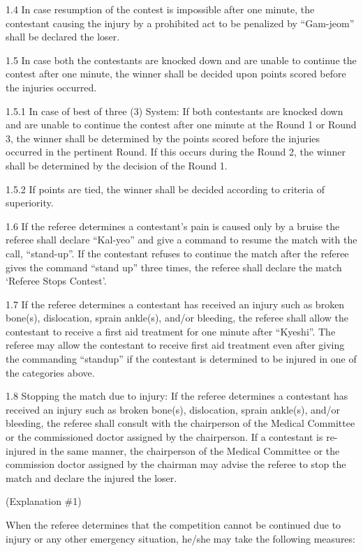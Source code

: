 \documentclass[
]{report}
\begin{document}
1.4 In case resumption of the contest is impossible after one minute,
the contestant causing the injury by a prohibited act to be penalized by
``Gam-jeom'' shall be declared the loser.

1.5 In case both the contestants are knocked down and are unable to
continue the contest after one minute, the winner shall be decided upon
points scored before the injuries occurred.

1.5.1 In case of best of three (3) System: If both contestants are
knocked down and are unable to continue the contest after one minute at
the Round 1 or Round 3, the winner shall be determined by the points
scored before the injuries occurred in the pertinent Round. If this
occurs during the Round 2, the winner shall be determined by the
decision of the Round 1.

1.5.2 If points are tied, the winner shall be decided according to
criteria of superiority.

1.6 If the referee determines a contestant's pain is caused only by a
bruise the referee shall declare ``Kal-yeo'' and give a command to
resume the match with the call, ``stand-up''. If the contestant refuses
to continue the match after the referee gives the command ``stand up''
three times, the referee shall declare the match `Referee Stops
Contest'.

1.7 If the referee determines a contestant has received an injury such
as broken bone(s), dislocation, sprain ankle(s), and/or bleeding, the
referee shall allow the contestant to receive a first aid treatment for
one minute after ``Kyeshi''. The referee may allow the contestant to
receive first aid treatment even after giving the commanding ``standup''
if the contestant is determined to be injured in one of the categories
above.

1.8 Stopping the match due to injury: If the referee determines a
contestant has received an injury such as broken bone(s), dislocation,
sprain ankle(s), and/or bleeding, the referee shall consult with the
chairperson of the Medical Committee or the commissioned doctor assigned
by the chairperson. If a contestant is re-injured in the same manner,
the chairperson of the Medical Committee or the commission doctor
assigned by the chairman may advise the referee to stop the match and
declare the injured the loser.

(Explanation \#1)

When the referee determines that the competition cannot be continued due
to injury or any other emergency situation, he/she may take the
following measures:
\end{document}
